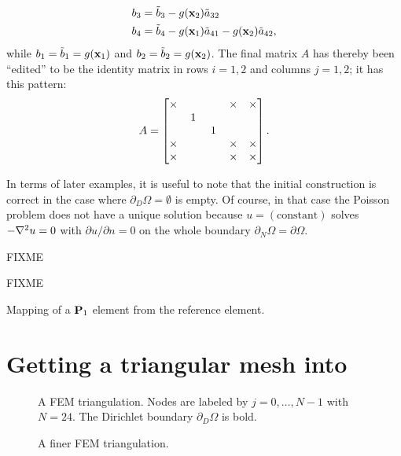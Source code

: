 \begin{example}
\begin{align*}
b_3 &= \tilde b_3 - g(\mathbf{x}_2) \tilde a_{32} \\
b_4 &= \tilde b_4 - g(\mathbf{x}_1) \tilde a_{41} - g(\mathbf{x}_2) \tilde a_{42},
\end{align*}
while $b_1=\tilde b_1=g(\mathbf{x}_1)$ and $b_2 = \tilde b_2 = g(\mathbf{x}_2)$.  The final matrix $A$ has thereby been ``edited'' to be the identity matrix in rows $i=1,2$ and columns $j=1,2$; it has this pattern:
\begin{equation*}
A = \begin{bmatrix}
\times & & & \times & \times \\
 & \,1\, & & & \\
 & & \,1\, & & \\
\times & & & \times & \times \\
\times & & & \times & \times
\end{bmatrix}.
\end{equation*}
\end{example}
\noindent\hrulefill

\bigskip

In terms of later examples, it is useful to note that the initial construction is correct in the case where $\partial_D \Omega = \emptyset$ is empty.  Of course, in that case the Poisson problem does not have a unique solution because $u=(\text{constant})$ solves $-\nabla^2 u=0$ with $\partial u/\partial n = 0$ on the whole boundary $\partial_N \Omega = \partial \Omega$.

\vspace{0.5in}
FIXME




\begin{marginfigure}
FIXME
\caption{Mapping of a $\mathbf{P}_1$ element from the reference element.}
\label{fig:isoparametric}
\end{marginfigure}



\clearpage

\section{Getting a triangular mesh into \PETSc}

\begin{figure*}

\caption{A FEM triangulation.  Nodes are labeled by $j=0,\dots,N-1$ with $N=24$.  The Dirichlet boundary $\partial_D \Omega$ is bold.}
\label{fig:triangulation}
\end{figure*}

\begin{figure*}

\caption{A finer FEM triangulation.}
\label{fig:finertriangulation}
\end{figure*}

